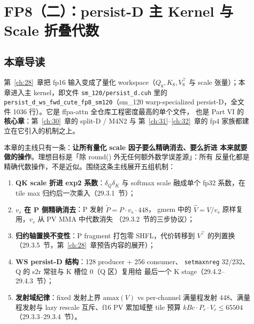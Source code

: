 \chapter{FP8（二）：persist-D 主 Kernel 与 Scale 折叠代数}\label{ch:29}

\section{本章导读}

第~\ref{ch:28}~章把 fp16 输入变成了量化 workspace（$Q_8,K_8,V_8^{\top}$ 与
scale 张量）；本章进入主 kernel，即文件 \texttt{sm\_120/persist\_d.cuh} 里的
\texttt{persist\_d\_ws\_fwd\allowbreak{}\_cute\_fp8\allowbreak{}\_sm120}（sm\_120 warp-specialized
persist-D，全文件 1036 行）。它是 ffpa-attn 全仓库工程密度最高的单个文件，
也是 Part VI 的\textbf{核心章}：第~\ref{ch:30}~章的 split-D / M4N2 与
第~\ref{ch:31}--\ref{ch:32}~章的 fp4 家族都建立在它引入的机制之上。

本章的主线只有一条：\textbf{让所有量化 scale 因子要么精确消去、要么折进
本来就要做的操作}。理想目标是「除 round() 外无任何额外数学误差源」：所有
反量化都是精确代数操作，不是近似。围绕这条主线展开五组机制：
\begin{enumerate}[itemsep=0pt,topsep=2pt]
  \item \textbf{QK scale 折进 exp2 系数}：$\delta_Q\delta_K$ 与 softmax scale
        融成单个 fp32 系数，在 tile max 归约后一次乘入（29.3.1~节）；
  \item \textbf{$v_s$ 在 P 侧精确消去}：P 发射 $\tilde P = P\cdot v_s\cdot448$，
        gmem 中的 $\hat V = V/v_s$ 原样复用，$v_s$ 从 PV MMA 中代数消失
        （29.3.2~节的三步协议）；
  \item \textbf{归约轴置换不变性}：P fragment 打包零 SHFL，代价转移到
        $V^{\top}$ 的列置换（29.3.5~节，第~\ref{ch:28}~章预告内容的展开）；
  \item \textbf{WS persist-D 结构}：128 producer + 256 consumer、
        \texttt{setmaxnreg} 32/232、Q 的 s2r 常驻与 K 槽位 0（Q 区）复用给
        最后一个 K stage（29.4.2--29.4.3~节）；
  \item \textbf{发射域纪律}：fixed 发射上界 $\mathrm{amax}(V)$ vs per-channel
        满量程发射 448、满量程发射与 lazy rescale 互斥、f16 PV 累加域整 tile
        预算 $kBc\cdot P_r\cdot V_r\le65504$（29.3.3--29.3.4~节）。
\end{enumerate}

